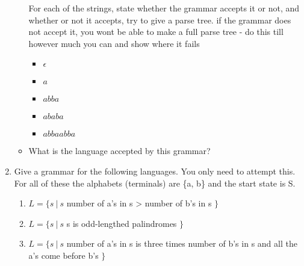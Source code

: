 \documentclass[10pt]{article}
\begin{document}
\begin{enumerate}
\begin{itemize}
    For each of the strings, state whether the grammar accepts it or not, and whether or not it accepts, try to give a parse tree. if the grammar does not accept it, you wont be able to make a full parse tree - do this till however much you can and show where it fails
    \begin{itemize}
        \item $\epsilon$
        \item $a$
        \item $abba$
        \item $ababa$
        \item $abbaabba$
    \end{itemize}
        \item What is the language accepted by this grammar?

\end{itemize}

\item Give a grammar for the following languages. You only need to attempt this. For all of these the alphabets (terminals) are \{a, b\} and the start state is S.
\begin{enumerate}
    \item $L = \{s~|~ s $ number of a's in s > number of b's in s   $\}$
    \item $L = \{s~|~ s $ s is odd-lengthed palindromes  $\} $
    \item $L = \{s~|~ s $ number of a's in s is three times number of b's in s and all the a's come before b's  $\}$
\end{enumerate}

\end{enumerate}
\end{document}
